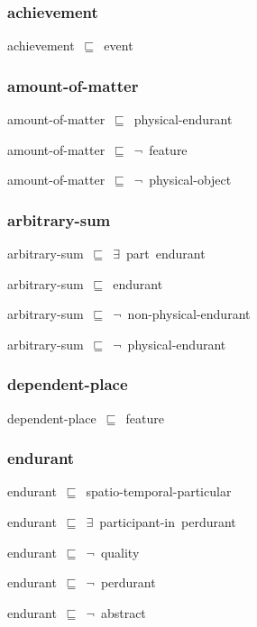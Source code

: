 \documentclass{article}
\begin{document}
\subsubsection*{achievement}

achievement~\ensuremath{\sqsubseteq}~event~

\subsubsection*{amount-of-matter}

amount-of-matter~\ensuremath{\sqsubseteq}~physical-endurant~

amount-of-matter~\ensuremath{\sqsubseteq}~\ensuremath{\lnot}~feature

amount-of-matter~\ensuremath{\sqsubseteq}~\ensuremath{\lnot}~physical-object

\subsubsection*{arbitrary-sum}

arbitrary-sum~\ensuremath{\sqsubseteq}~\ensuremath{\exists}~part~endurant~

arbitrary-sum~\ensuremath{\sqsubseteq}~endurant~

arbitrary-sum~\ensuremath{\sqsubseteq}~\ensuremath{\lnot}~non-physical-endurant

arbitrary-sum~\ensuremath{\sqsubseteq}~\ensuremath{\lnot}~physical-endurant

\subsubsection*{dependent-place}

dependent-place~\ensuremath{\sqsubseteq}~feature~

\subsubsection*{endurant}

endurant~\ensuremath{\sqsubseteq}~spatio-temporal-particular~

endurant~\ensuremath{\sqsubseteq}~\ensuremath{\exists}~participant-in~perdurant~

endurant~\ensuremath{\sqsubseteq}~\ensuremath{\lnot}~quality

endurant~\ensuremath{\sqsubseteq}~\ensuremath{\lnot}~perdurant

endurant~\ensuremath{\sqsubseteq}~\ensuremath{\lnot}~abstract
\end{document}
